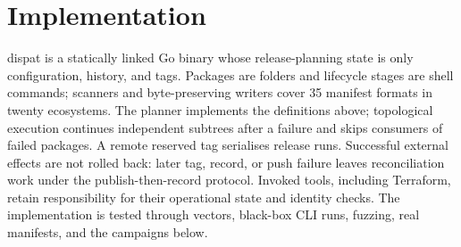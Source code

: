 \documentclass[sigconf,nonacm]{acmart}
\begin{document}
\begin{table}[t]
\caption{Pinned release-tool configurations.}
\label{tab:compare}
\scriptsize
{}
\end{table}

\section{Implementation}
\label{sec:impl}

dispat is a statically linked Go binary whose release-planning state is only
configuration, history, and tags. Packages are folders and lifecycle stages
are shell commands; scanners and byte-preserving writers cover 35 manifest
formats in twenty ecosystems. The planner implements the definitions above;
topological execution continues independent subtrees after a failure and
skips consumers of failed packages. A remote reserved tag serialises release
runs. Successful external effects are not rolled back: later tag, record, or
push failure leaves reconciliation work under the publish-then-record protocol. Invoked tools,
including Terraform, retain responsibility for their operational state and
identity checks. The implementation is tested through vectors, black-box CLI
runs, fuzzing, real manifests, and the campaigns below.
\end{document}
